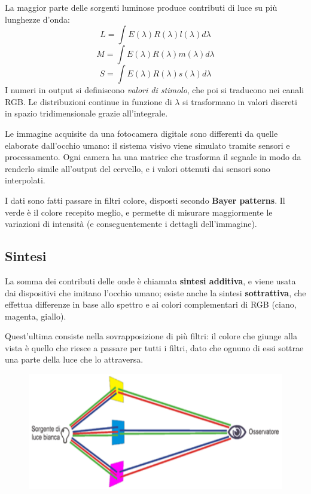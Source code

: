 La maggior parte delle sorgenti luminose produce contributi di luce su più lunghezze d'onda:
$$L = \int E(\lambda) R(\lambda) l(\lambda) d\lambda$$
$$M = \int E(\lambda) R(\lambda) m(\lambda) d\lambda$$
$$S = \int E(\lambda) R(\lambda) s(\lambda) d\lambda$$
I numeri in output si definiscono \textit{valori di stimolo}, che poi si traducono nei canali RGB. Le distribuzioni continue in funzione di $\lambda$ si trasformano in valori discreti in spazio tridimensionale grazie all'integrale.

Le immagine acquisite da una fotocamera digitale sono differenti da quelle elaborate dall'occhio umano: il sistema visivo viene simulato tramite sensori e processamento. Ogni camera ha una matrice che trasforma il segnale in modo da renderlo simile all'output del cervello, e i valori ottenuti dai sensori sono interpolati. 

I dati sono fatti passare in filtri colore, disposti secondo \textbf{Bayer patterns}. Il verde è il colore recepito meglio, e permette di misurare maggiormente le variazioni di intensità (e conseguentemente i dettagli dell'immagine). 

\subsection{Sintesi}
La somma dei contributi delle onde è chiamata \textbf{sintesi additiva}, e viene usata dai dispositivi che imitano l'occhio umano; esiste anche la sintesi \textbf{sottrattiva}, che effettua differenze in base allo spettro e ai colori complementari di RGB (ciano, magenta, giallo). 

Quest'ultima consiste nella sovrapposizione di più filtri: il colore che giunge alla vista è quello che riesce a passare per tutti i filtri, dato che ognuno di essi sottrae una parte della luce che lo attraversa. 

\begin{figure}[h]
	\centering
	\includegraphics[scale=0.6]{Lezioni/Immagini/occhio}
\end{figure}


